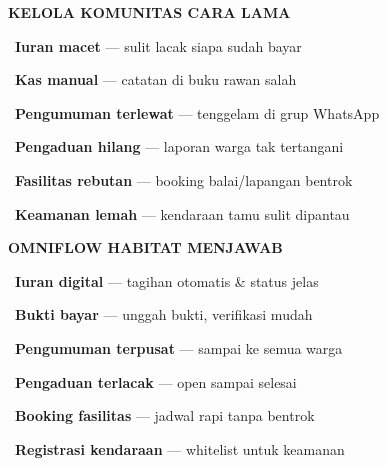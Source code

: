 \documentclass[a4paper]{article}
\begin{document}
\noindent
\begin{minipage}[t]{0.485\textwidth}
    \colorbox{RedLight}{%
        \begin{minipage}{\dimexpr\textwidth-2\fboxsep\relax}
            {\fontsize{10}{13}\selectfont\bfseries\color{RedText} KELOLA KOMUNITAS CARA LAMA}
        \end{minipage}}\par
    \vspace{4pt}

    {\fontsize{9.5}{13}\selectfont\color{TextDark}%
    \textbullet\ \textbf{Iuran macet} --- sulit lacak siapa sudah bayar\par\vspace{4pt}%
    \textbullet\ \textbf{Kas manual} --- catatan di buku rawan salah\par\vspace{4pt}%
    \textbullet\ \textbf{Pengumuman terlewat} --- tenggelam di grup WhatsApp\par\vspace{4pt}%
    \textbullet\ \textbf{Pengaduan hilang} --- laporan warga tak tertangani\par\vspace{4pt}%
    \textbullet\ \textbf{Fasilitas rebutan} --- booking balai/lapangan bentrok\par\vspace{4pt}%
    \textbullet\ \textbf{Keamanan lemah} --- kendaraan tamu sulit dipantau}%
\end{minipage}%
\hfill%
\begin{minipage}[t]{0.485\textwidth}
    \colorbox{BluePrimary}{%
        \begin{minipage}{\dimexpr\textwidth-2\fboxsep\relax}
            {\fontsize{10}{13}\selectfont\bfseries\color{White} OMNIFLOW HABITAT MENJAWAB}
        \end{minipage}}\par
    \vspace{4pt}

    {\fontsize{9.5}{13}\selectfont\color{TextDark}%
    \textbullet\ \textbf{Iuran digital} --- tagihan otomatis \& status jelas\par\vspace{4pt}%
    \textbullet\ \textbf{Bukti bayar} --- unggah bukti, verifikasi mudah\par\vspace{4pt}%
    \textbullet\ \textbf{Pengumuman terpusat} --- sampai ke semua warga\par\vspace{4pt}%
    \textbullet\ \textbf{Pengaduan terlacak} --- open sampai selesai\par\vspace{4pt}%
    \textbullet\ \textbf{Booking fasilitas} --- jadwal rapi tanpa bentrok\par\vspace{4pt}%
    \textbullet\ \textbf{Registrasi kendaraan} --- whitelist untuk keamanan}%
\end{minipage}
\end{document}
